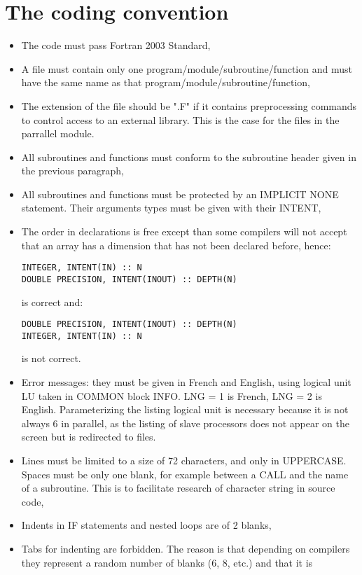 \section{The coding convention}

\begin{itemize}
\item The code must pass Fortran 2003 Standard,
\item A file must contain only one program/module/subroutine/function and must
have the same name as that program/module/subroutine/function,
\item The extension of the file should be ".F" if it contains preprocessing
  commands to control access to an external library. This is the case for the
  files in the parrallel module.
\item All subroutines and functions must conform to the subroutine header given
in the previous paragraph,
\item All subroutines and functions must be protected by an IMPLICIT NONE
statement. Their arguments types must be given with their INTENT,
\item The order in declarations is free except than some compilers will not
accept that an array has a dimension that has not been declared before, hence:
\begin{lstlisting}
INTEGER, INTENT(IN) :: N
DOUBLE PRECISION, INTENT(INOUT) :: DEPTH(N)
\end{lstlisting}
is correct and:
\begin{lstlisting}
DOUBLE PRECISION, INTENT(INOUT) :: DEPTH(N)
INTEGER, INTENT(IN) :: N
\end{lstlisting}
is not correct.
\item Error messages: they must be given in French and English, using logical
unit LU taken in COMMON block INFO. LNG = 1 is French, LNG = 2 is English.
Parameterizing the listing logical unit is necessary because it is not always 6
in parallel, as the listing of slave processors does not appear on the screen
but is redirected to files.
\item Lines must be limited to a size of 72 characters, and only in UPPERCASE.
Spaces must be only one blank, for example between a CALL and the name of a
subroutine. This is to facilitate research of character string in source code,
\item Indents in IF statements and nested loops are of 2 blanks,
\item Tabs for indenting are forbidden. The reason is that depending on
compilers they represent a random number of blanks (6, 8, etc.) and that it is

\end{itemize}
